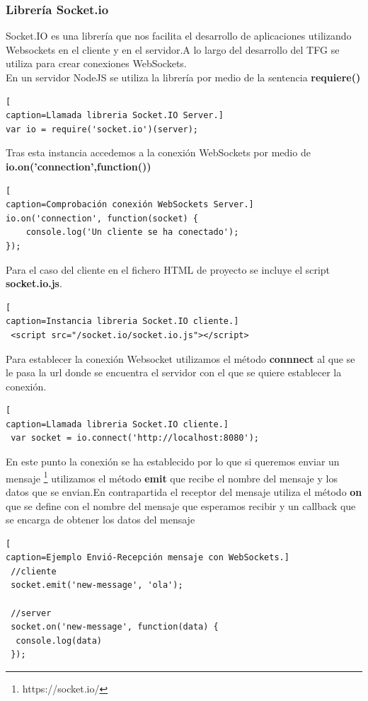 \subsubsection*{Librería Socket.io}
Socket.IO\cite{socketIO} es una librería que nos facilita el desarrollo de aplicaciones utilizando Websockets en el cliente y en el servidor.A lo largo del desarrollo del TFG se utiliza para crear conexiones WebSockets.
\\En un servidor NodeJS se utiliza la librería por medio de la sentencia \textbf{requiere()}
\begin{lstlisting}[
caption=Llamada libreria Socket.IO Server.]
var io = require('socket.io')(server); 
\end{lstlisting}
Tras esta instancia accedemos a la conexión WebSockets por medio de \textbf{io.on('connection',function())} 
\begin{lstlisting}[
caption=Comprobación conexión WebSockets Server.]
io.on('connection', function(socket) {  
    console.log('Un cliente se ha conectado');
});
\end{lstlisting}
Para el caso del cliente en el fichero HTML de proyecto se incluye el script \textbf{socket.io.js}.
\begin{lstlisting}[
caption=Instancia libreria Socket.IO cliente.]
 <script src="/socket.io/socket.io.js"></script> 
\end{lstlisting}
Para establecer la conexión Websocket utilizamos el método \textbf{connnect} al que se le pasa la url donde se encuentra el servidor con el que se quiere establecer la conexión.
\begin{lstlisting}[
caption=Llamada libreria Socket.IO cliente.]
 var socket = io.connect('http://localhost:8080');
\end{lstlisting}
En este punto la conexión se ha establecido por lo que si queremos enviar un mensaje \footnote{https://socket.io/} utilizamos el método \textbf{emit} que recibe el nombre del mensaje y los datos que se envian.En contrapartida el receptor del mensaje utiliza el método \textbf{on} que se define con el nombre del mensaje que esperamos recibir y un callback que se encarga de obtener los datos del mensaje
\begin{lstlisting}[
caption=Ejemplo Envió-Recepción mensaje con WebSockets.]
 //cliente 
 socket.emit('new-message', 'ola');
 
 //server
 socket.on('new-message', function(data) {  
  console.log(data)
 });

\end{lstlisting}
